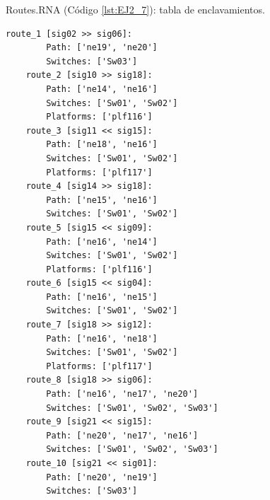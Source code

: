 	Routes.RNA (Código \ref{lst:EJ2_7}): tabla de enclavamientos.
	
	\begin{lstlisting}[language = {}, caption = Routes.RNA, label = {lst:EJ2_7}]
	route_1 [sig02 >> sig06]:
		Path: ['ne19', 'ne20']
		Switches: ['Sw03']
	route_2 [sig10 >> sig18]:
		Path: ['ne14', 'ne16']
		Switches: ['Sw01', 'Sw02']
		Platforms: ['plf116']
	route_3 [sig11 << sig15]:
		Path: ['ne18', 'ne16']
		Switches: ['Sw01', 'Sw02']
		Platforms: ['plf117']
	route_4 [sig14 >> sig18]:
		Path: ['ne15', 'ne16']
		Switches: ['Sw01', 'Sw02']
	route_5 [sig15 << sig09]:
		Path: ['ne16', 'ne14']
		Switches: ['Sw01', 'Sw02']
		Platforms: ['plf116']
	route_6 [sig15 << sig04]:
		Path: ['ne16', 'ne15']
		Switches: ['Sw01', 'Sw02']
	route_7 [sig18 >> sig12]:
		Path: ['ne16', 'ne18']
		Switches: ['Sw01', 'Sw02']
		Platforms: ['plf117']
	route_8 [sig18 >> sig06]:
		Path: ['ne16', 'ne17', 'ne20']
		Switches: ['Sw01', 'Sw02', 'Sw03']
	route_9 [sig21 << sig15]:
		Path: ['ne20', 'ne17', 'ne16']
		Switches: ['Sw01', 'Sw02', 'Sw03']
	route_10 [sig21 << sig01]:
		Path: ['ne20', 'ne19']
		Switches: ['Sw03']
	\end{lstlisting}